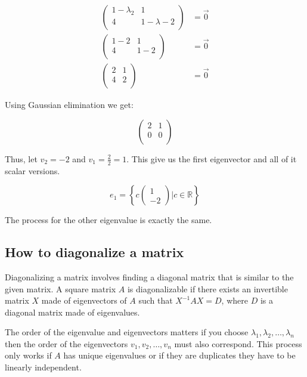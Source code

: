 \begin{align*}
    \begin{pmatrix} 1 - \lambda_2 & 1 \\ 4 & 1 - \lambda-2 \\ \end{pmatrix} &= \vec{0} \\
    \begin{pmatrix} 1 - 2 & 1 \\ 4 & 1 - 2 \\ \end{pmatrix} &= \vec{0} \\
    \begin{pmatrix} 2 & 1 \\ 4 & 2 \\ \end{pmatrix} &= \vec{0} 
\end{align*}

Using Gaussian elimination we get: 

\[
\begin{pmatrix} 
    2 & 1 \\ 
    0 & 0 \\ 
\end{pmatrix} 
\]

Thus, let \(v_2 = -2\) and \(v_1 = \frac{2}{2} = 1\). This give us the first eigenvector and all of it 
scalar versions.

\[
e_1 = \left\{ c \begin{pmatrix} 1 \\ -2 \end{pmatrix} | c \in \mathbb{R}\right\}
\]

The process for the other eigenvalue is exactly the same.


\subsection{How to diagonalize a matrix}

Diagonalizing a matrix involves finding a diagonal matrix that is similar to the given matrix. 
A square matrix \(A\) is diagonalizable if there exists an invertible matrix \(X\) made of eigenvectors of 
\(A\) such that \(X^{-1}AX = D\), where \(D\) is a diagonal matrix made of eigenvalues.

The order of the eigenvalue and eigenvectors matters if you choose \(\lambda_1, \lambda_2, \dots, \lambda_n\) then the 
order of the eigenvectors \(v_1, v_2, \dots, v_n\) must also correspond. This process only works if \(A\) 
has unique eigenvalues or if they are duplicates they have to be linearly independent.
\vspace{\baselineskip}

